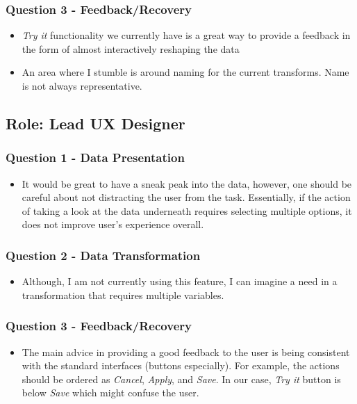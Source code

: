 \documentclass[12pt,letterpaper]{article}
\begin{document}
\subsubsection*{Question 3 - Feedback/Recovery}
\begin{itemize}
    \item \textit{Try it} functionality we currently have is a great way to provide a feedback in the form of almost interactively reshaping the data
    \item An area where I stumble is around naming for the current transforms. Name is not always representative.
\end{itemize}

\subsection*{Role: Lead UX Designer}
\subsubsection*{Question 1 - Data Presentation}

\begin{itemize}
    \item It would be great to have a sneak peak into the data, however, one should be careful about not distracting the user from the task. Essentially, if the action of taking a look at the data underneath requires selecting multiple options, it does not improve user's experience overall. 
\end{itemize}

\subsubsection*{Question 2 - Data Transformation}
\begin{itemize}
    \item Although, I am not currently using this feature, I can imagine a need in a transformation that requires multiple variables.
\end{itemize}

\subsubsection*{Question 3 - Feedback/Recovery}
\begin{itemize}
    \item The main advice in providing a good feedback to the user is being consistent with the standard interfaces (buttons especially). For example, the actions should be ordered as \textit{Cancel}, \textit{Apply}, and \textit{Save}. In our case, \textit{Try it} button is below \textit{Save} which might confuse the user.
\end{itemize}
\end{document}
